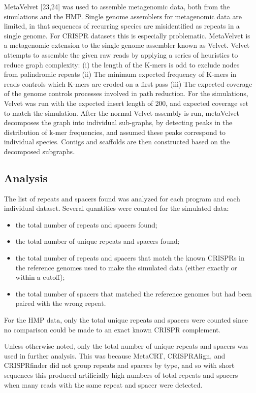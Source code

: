 \documentclass{bmcart}
\begin{document}
MetaVelvet [23,24] was used to assemble metagenomic data, both from the simulations and the HMP. Single genome assemblers for metagenomic data are limited, in that sequences of recurring species are misidentified as repeats in a single genome. For CRISPR datasets this is especially problematic. MetaVelvet is a metagenomic extension to the single genome assembler known as Velvet. Velvet attempts to assemble the given raw reads by applying a series of heuristics to reduce graph complexity: (i)  the length of the K-mers is odd to exclude nodes from palindromic repeats (ii) The minimum expected frequency of K-mers in reads controls which K-mers are eroded on a first pass (iii) The expected coverage of the genome controls processes involved in path reduction. For the simulations, Velvet was run with the expected insert length of 200, and expected coverage set to match the simulation. After the normal Velvet assembly is run, metaVelvet decomposes the graph into individual sub-graphs, by detecting peaks in the distribution of k-mer frequencies, and assumed these peaks correspond to individual species. Contigs and scaffolds are then constructed based on the decomposed subgraphs.

\subsection*{Analysis}
The list of repeats and spacers found was analyzed for each program and each individual dataset. Several quantities were counted for the simulated data:
\begin{itemize}
\item	the total number of repeats and spacers found;
\item	the total number of unique repeats and spacers found;
\item	the total number of repeats and spacers that match the known CRISPRs in the reference genomes used to make the simulated data (either exactly or within a cutoff);
\item	the total number of spacers that matched the reference genomes but had been paired with the wrong repeat.
\end{itemize}

For the HMP data, only the total unique repeats and spacers were counted since no comparison could be made to an exact known CRISPR complement. 

Unless otherwise noted, only the total number of unique repeats and spacers was used in further analysis. This was because MetaCRT, CRISPRAlign, and CRISPRfinder did not group repeats and spacers by type, and so with short sequences this produced artificially high numbers of total repeats and spacers when many reads with the same repeat and spacer were detected.  
\end{document}
